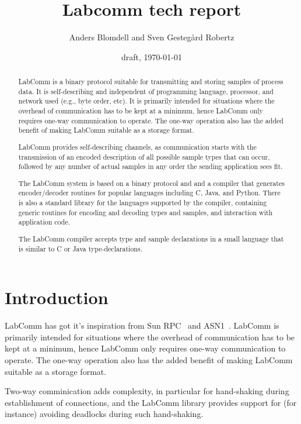 \documentclass[a4paper]{article}
\begin{document}
\title{Labcomm tech report}
\author{Anders Blomdell and Sven Gesteg\aa{}rd Robertz }
\date{draft, \today}

\maketitle

\begin{abstract}

LabComm is a binary protocol suitable for transmitting and storing samples of
process data. It is self-describing and independent of programming language,
processor, and network used (e.g., byte order, etc).  It is primarily intended
for situations where the overhead of communication has to be kept at a minimum,
hence LabComm only requires one-way communication to operate. The one-way
operation also has the added benefit of making LabComm suitable as a storage
format.

LabComm provides self-describing channels, as communication starts with the
transmission of an encoded description of all possible sample types that can
occur, followed by any number of actual samples in any order the sending
application sees fit.

The LabComm system is based on a binary protocol and
and a compiler that generates encoder/decoder routines for popular languages
including C, Java, and Python. There is also a standard library for the
languages supported by the compiler, containing generic routines for
encoding and decoding types and samples, and interaction with
application code.

The LabComm compiler accepts type and sample declarations in a small language
that is similar to C or Java type-declarations.
\end{abstract}
\section{Introduction}


LabComm has got it's inspiration from Sun RPC~\cite{SunRPC}
and ASN1~\cite{ASN1}. LabComm is primarily intended for situations
where the overhead of communication has to be kept at a minimum, hence LabComm
only requires one-way communication to operate. The one-way operation also has
the added benefit of making LabComm suitable as a storage format.

Two-way comminication adds complexity, in particular for hand-shaking
during establishment of connections, and the LabComm library provides
support for (for instance) avoiding deadlocks during such hand-shaking.
\end{document}

